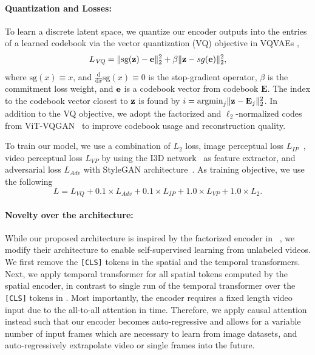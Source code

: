 \paragraph{Quantization and Losses:}
To learn a discrete latent space, we quantize our encoder outputs into the entries of a learned codebook via the vector quantization (VQ) objective in VQVAEs \citep{vqvae},
\begin{equation}
    L_{\textit{VQ}} = \| \text{sg}(\mathbf{z}) - \mathbf{e} \|^2_2 + \beta \| \mathbf{z} - sg(\mathbf{e}) \|^2_2,
\end{equation}
where $\text{sg}(x) \equiv x$, and $\frac{\text{d}}{\text{d}x} \text{sg}(x) \equiv 0$ is the stop-gradient operator, $\beta$ is the commitment loss weight, and $\mathbf{e}$ is a codebook vector from codebook $\mathbf{E}$. The index to the codebook vector closest to $\mathbf{z}$ is found by $i = \text{argmin}_j \| \mathbf{z} - \mathbf{E}_j \|^2_2$. 
In addition to the VQ objective, we adopt the factorized and $\ell_2$-normalized codes from ViT-VQGAN~\citep{vit_vqgan} to improve codebook usage and reconstruction quality.

To train our model, we use a combination of $L_2$ loss, image perceptual loss $L_{\textit{IP}}$~\citep{JohnsonPerceptual2016,ZhangPerceptual2018}, video perceptual loss $L_{\textit{VP}}$ by using the I3D network~\citep{i3d} as feature extractor, and adversarial loss $L_{\textit{Adv}}$ with StyleGAN architecture~\citep{stylegan}.
As training objective, we use the following
\begin{equation}
    L = L_{\textit{VQ}} + 0.1\times L_{\textit{Adv}} + 0.1\times L_{\textit{IP}} + 1.0\times L_{\textit{VP}} + 1.0\times L_2.
\end{equation}

\paragraph{Novelty over the \vivit architecture:}
While our proposed \cvivit architecture is inspired by the factorized encoder in \vivit~\cite{vivit}, we modify their architecture to enable self-supervised learning from unlabeled videos. We first remove the \texttt{[CLS]} tokens in the spatial and the temporal transformers. Next, we apply temporal transformer for all spatial tokens computed by the spatial encoder, in contrast to  single run of the temporal transformer over the \texttt{[CLS]} tokens in \vivit.
Most importantly, the \vivit encoder requires a fixed length video input due to the all-to-all attention in time. Therefore, we apply causal attention instead such that our \cvivit encoder becomes auto-regressive and allows for a variable number of input frames which are necessary to learn from image datasets, and auto-regressively extrapolate video or single frames into the future. 


